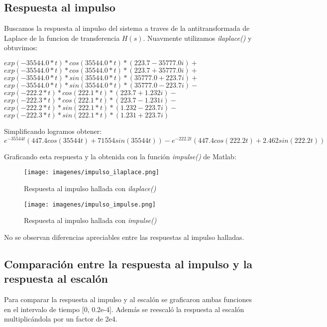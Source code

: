 \documentclass[12pt, titlepage]{article}
\begin{document}
    \subsection{Respuesta al impulso} 
    Buscamos la respuesta al impulso del sistema a traves de la antitransformada de Laplace de la funcion de transferencia $H(s)$. Nuavmente utilizamos \emph{ilaplace()} y obtuvimos:
    \begin{center}
    $exp(-35544.0*t)*cos(35544.0*t)*(223.7 - 35777.0i) + $\\ $exp(-35544.0*t)*cos(35544.0*t)*(223.7 + 35777.0i) + $\\ $exp(-35544.0*t)*sin(35544.0*t)*(35777.0 + 223.7i) + $\\ $exp(-35544.0*t)*sin(35544.0*t)*(35777.0 - 223.7i) - $\\ $exp(-222.2*t)*cos(222.1*t)*(223.7 + 1.232i) - $\\
    $exp(-222.3*t)*cos(222.1*t)*(223.7 - 1.231i) -  $\\
    $exp(-222.2*t)*sin(222.1*t)*(1.232 - 223.7i) -  $\\ 
    $exp(-222.3*t)*sin(222.1*t)*(1.231 + 223.7i)$ 
    \end{center}
    
    Simplificando logramos obtener: 
     \begin{equation}
        e^{-35544t}(447.4cos(35544t) + 71554sin(35544t)) -  e^{-222.2t}(447.4cos(222.2t) + 2.462sin(222.2t))
    \end{equation}

    \newpage
    
    Graficando esta respuesta y la obtenida con la función \emph{impulse()} de Matlab:
    
    \begin{figure}[!htb]
     \texttt{[image: imagenes/impulso\_ilaplace.png]}
     \centering
     \caption{Respuesta al impulso hallada con \emph{ilaplace()}}
    \end{figure}
    
    \begin{figure}[!htb]
     \texttt{[image: imagenes/impulso\_impulse.png]}
     \centering
     \caption{Respuesta al impulso hallada con \emph{impulse()}}
    \end{figure}

    No se observan diferencias apreciables entre las respuestas al impulso halladas.
    
    \subsection{Comparación entre la respuesta al impulso y la respuesta al escalón}
    Para comparar la respuesta al impulso y al escalón se graficaron ambas funciones en el intervalo de tiempo [0, 0.2e-4]. Además se reescaló la respuesta al escalón multiplicándola por un factor de 2e4.
    
\end{document}
